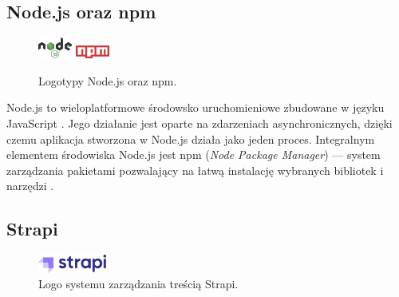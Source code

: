\documentclass[12pt]{article}
\numberwithin{figure}{section}
\begin{document}
\begin{sloppypar}

\subsection*{Node.js oraz npm}

\begin{figure}[H] 
    \centering
        \includegraphics[width=0.1\textwidth]{images/node-logo.png}\hspace{16pt}
        \includegraphics[width=0.1\textwidth]{images/npm-logo.png}
    \caption{Logotypy Node.js oraz npm.}
\end{figure}

Node.js to wieloplatformowe środowsko uruchomieniowe zbudowane w języku JavaScript \cite{node}. Jego działanie jest oparte na zdarzeniach asynchronicznych, dzięki czemu aplikacja stworzona w Node.js działa jako jeden proces. Integralnym elementem środowiska Node.js jest npm (\textit{Node Package Manager}) --- system zarządzania pakietami pozwalający na łatwą instalację wybranych bibliotek i narzędzi \cite{npm}. 


\subsection*{Strapi}

\begin{figure}[H] 
    \centering
        \includegraphics[width=0.2\textwidth]{images/strapi-logo.png}
   \caption{Logo systemu zarządzania treścią Strapi.}
\end{figure}


\end{sloppypar}
\end{document}
